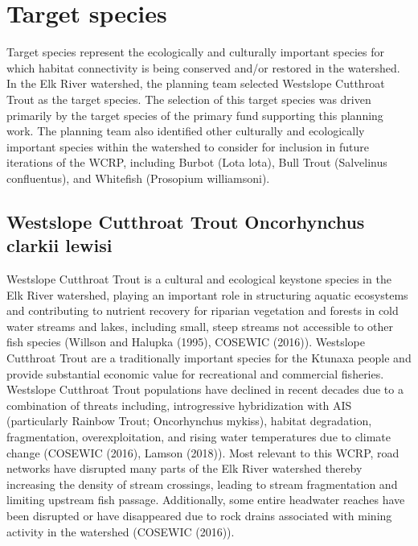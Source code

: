 \documentclass[
  letterpaper,
  DIV=11,
  numbers=noendperiod]{scrreprt}
\begin{document}
\section*{Target species}\label{target-species}


Target species represent the ecologically and culturally important
species for which habitat connectivity is being conserved and/or
restored in the watershed. In the Elk River watershed, the planning team
selected Westslope Cutthroat Trout as the target species. The selection
of this target species was driven primarily by the target species of the
primary fund supporting this planning work. The planning team also
identified other culturally and ecologically important species within
the watershed to consider for inclusion in future iterations of the
WCRP, including Burbot (Lota lota), Bull Trout (Salvelinus confluentus),
and Whitefish (Prosopium williamsoni).

\subsection*{Westslope Cutthroat Trout \textbar{} Oncorhynchus clarkii
lewisi}\label{westslope-cutthroat-trout-oncorhynchus-clarkii-lewisi}

Westslope Cutthroat Trout is a cultural and ecological keystone species
in the Elk River watershed, playing an important role in structuring
aquatic ecosystems and contributing to nutrient recovery for riparian
vegetation and forests in cold water streams and lakes, including small,
steep streams not accessible to other fish species (Willson and Halupka
(1995), COSEWIC (2016)). Westslope Cutthroat Trout are a traditionally
important species for the Ktunaxa people and provide substantial
economic value for recreational and commercial fisheries. Westslope
Cutthroat Trout populations have declined in recent decades due to a
combination of threats including, introgressive hybridization with AIS
(particularly Rainbow Trout; Oncorhynchus mykiss), habitat degradation,
fragmentation, overexploitation, and rising water temperatures due to
climate change (COSEWIC (2016), Lamson (2018)). Most relevant to this
WCRP, road networks have disrupted many parts of the Elk River watershed
thereby increasing the density of stream crossings, leading to stream
fragmentation and limiting upstream fish passage. Additionally, some
entire headwater reaches have been disrupted or have disappeared due to
rock drains associated with mining activity in the watershed (COSEWIC
(2016)).
\end{document}

